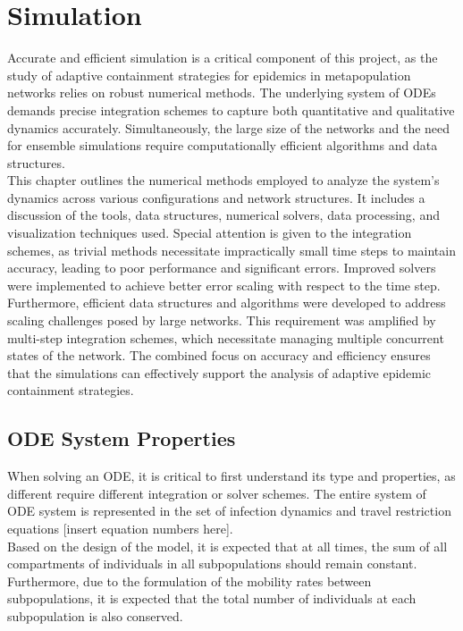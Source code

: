 \section{Simulation}
Accurate and efficient simulation is a critical component of this project, as the study of adaptive containment strategies for epidemics in metapopulation networks relies on robust numerical methods. The underlying system of ODEs demands precise integration schemes to capture both quantitative and qualitative dynamics accurately. Simultaneously, the large size of the networks and the need for ensemble simulations require computationally efficient algorithms and data structures.\\

This chapter outlines the numerical methods employed to analyze the system's dynamics across various configurations and network structures. It includes a discussion of the tools, data structures, numerical solvers, data processing, and visualization techniques used. Special attention is given to the integration schemes, as trivial methods necessitate impractically small time steps to maintain accuracy, leading to poor performance and significant errors. Improved solvers were implemented to achieve better error scaling with respect to the time step.\\

Furthermore, efficient data structures and algorithms were developed to address scaling challenges posed by large networks. This requirement was amplified by multi-step integration schemes, which necessitate managing multiple concurrent states of the network. The combined focus on accuracy and efficiency ensures that the simulations can effectively support the analysis of adaptive epidemic containment strategies.\\

\subsection{ODE System Properties}
When solving an ODE, it is critical to first understand its type and properties, as different require different integration or solver schemes. The entire system of ODE system is represented in the set of infection dynamics and travel restriction equations [insert equation numbers here].\\

Based on the design of the model, it is expected that at all times, the sum of all compartments of individuals in all subpopulations should remain constant. Furthermore, due to the formulation of the mobility rates between subpopulations, it is expected that the total number of individuals at each subpopulation is also conserved. \\

